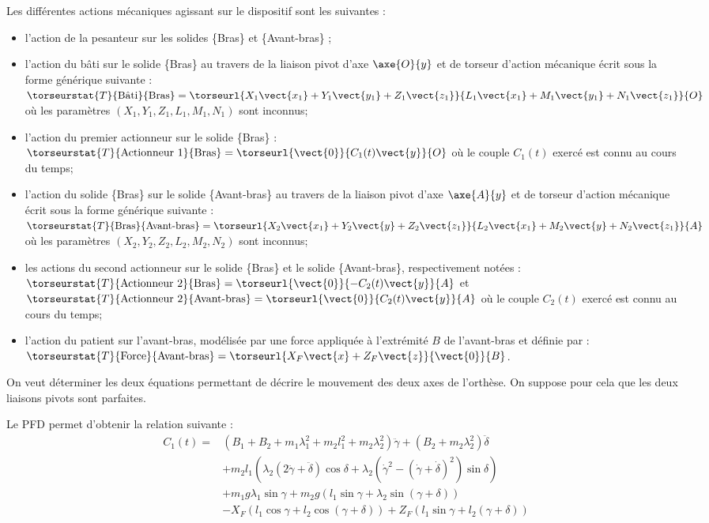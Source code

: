 \begin{multicols}{2}
Les différentes actions mécaniques agissant sur le dispositif sont les suivantes :
\begin{itemize}
\item l’action de la pesanteur sur les solides \{Bras\} et \{Avant-bras\} ;
\item l’action du bâti sur le solide \{Bras\} au travers de la liaison pivot d’axe $\axe{O}{y}$ et de torseur d’action mécanique écrit sous la forme générique suivante : 
$\torseurstat{T}{\text{Bâti}}{\text{Bras}}=\torseurl{X_1\vect{x_1}+Y_1\vect{y_1}+Z_1\vect{z_1}}{L_1\vect{x_1}+M_1\vect{y_1}+N_1\vect{z_1}}{O}$ où les paramètres $\left(X_1, Y_1, Z_1, L_1, M_1, N_1\right)$ sont inconnus;
\item l’action du premier actionneur sur le solide \{Bras\} :
$\torseurstat{T}{\text{Actionneur 1}}{\text{Bras}}=\torseurl{\vect{0}}{C_1(t) \vect{y}}{O}$ où le couple $C_1(t)$ exercé est connu au cours du temps;
\item  l’action du solide \{Bras\} sur le solide \{Avant-bras\} au travers de la liaison pivot d’axe $\axe{A}{y}$ et de torseur d’action mécanique écrit sous la forme générique suivante : 
$\torseurstat{T}{\text{Bras}}{\text{Avant-bras}}=\torseurl{X_2\vect{x_1}+Y_2\vect{y}+Z_2\vect{z_1}}{L_2\vect{x_1}+M_2\vect{y}+N_2\vect{z_1}}{A}$ où les paramètres $\left(X_2, Y_2, Z_2, L_2, M_2, N_2\right)$ sont inconnus;
\item les actions du second actionneur sur le solide \{Bras\} et le solide \{Avant-bras\}, respectivement notées :
$\torseurstat{T}{\text{Actionneur 2}}{\text{Bras}}=\torseurl{\vect{0}}{-C_2(t) \vect{y}}{A}$ et 
$\torseurstat{T}{\text{Actionneur 2}}{\text{Avant-bras}}=\torseurl{\vect{0}}{C_2(t) \vect{y}}{A}$ où le couple $C_2(t)$ exercé est connu au cours du temps;
\item l’action du patient sur l’avant-bras, modélisée par une force appliquée à l’extrémité $B$ de l’avant-bras et
définie par : 
$\torseurstat{T}{\text{Force}}{\text{Avant-bras}}=\torseurl{X_F\vect{x}+Z_F\vect{z}}{\vect{0}}{B}$. 
\end{itemize}

On veut déterminer les deux équations permettant de décrire le mouvement des deux axes de l’orthèse. On
suppose pour cela que les deux liaisons pivots sont parfaites.

Le PFD permet d'obtenir la relation suivante : 
$$
\begin{array}{ll}
C_1(t)=&
\left(B_1+B_2 +m_1 \lambda_1^2 + m_2 l_1^2 + m_2 \lambda_2^2 \right)\ddot{\gamma} +\left( B_2 + m_2\lambda_2^2\right) \ddot{\delta}\\
& +m_2 l_1 \left( \lambda_2 \left(2\ddot{\gamma}+\ddot{\delta} \right)\cos \delta + \lambda_2 \left( \dot{\gamma}^2-\left( \dot{\gamma} + \dot{\delta}\right)^2\right) \sin\delta\right) \\
& + m_1g\lambda_1\sin\gamma + m_2 g \left(l_1 \sin \gamma+\lambda_2 \sin \left(\gamma+ \delta\right) \right)\\
& -X_F \left( l_1 \cos \gamma +l_2 \cos \left( \gamma+\delta\right) \right) + Z_F \left( l_1 \sin \gamma + l_2 \left( \gamma + \delta \right)\right)
\end{array}
$$


\end{multicols}
